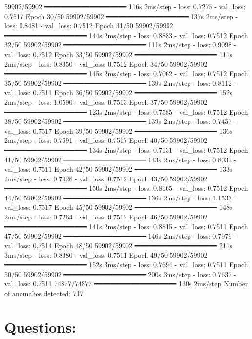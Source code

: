 59902/59902 ━━━━━━━━━━━━━━━━━━━━ 116s 2ms/step - loss: 0.7275 - val_loss: 0.7517
Epoch 30/50
59902/59902 ━━━━━━━━━━━━━━━━━━━━ 137s 2ms/step - loss: 0.8481 - val_loss: 0.7512
Epoch 31/50
59902/59902 ━━━━━━━━━━━━━━━━━━━━ 144s 2ms/step - loss: 0.8883 - val_loss: 0.7512
Epoch 32/50
59902/59902 ━━━━━━━━━━━━━━━━━━━━ 111s 2ms/step - loss: 0.9098 - val_loss: 0.7512
Epoch 33/50
59902/59902 ━━━━━━━━━━━━━━━━━━━━ 111s 2ms/step - loss: 0.8350 - val_loss: 0.7512
Epoch 34/50
59902/59902 ━━━━━━━━━━━━━━━━━━━━ 145s 2ms/step - loss: 0.7062 - val_loss: 0.7512
Epoch 35/50
59902/59902 ━━━━━━━━━━━━━━━━━━━━ 139s 2ms/step - loss: 0.8112 - val_loss: 0.7511
Epoch 36/50
59902/59902 ━━━━━━━━━━━━━━━━━━━━ 152s 2ms/step - loss: 1.0590 - val_loss: 0.7513
Epoch 37/50
59902/59902 ━━━━━━━━━━━━━━━━━━━━ 123s 2ms/step - loss: 0.7585 - val_loss: 0.7512
Epoch 38/50
59902/59902 ━━━━━━━━━━━━━━━━━━━━ 139s 2ms/step - loss: 0.7457 - val_loss: 0.7517
Epoch 39/50
59902/59902 ━━━━━━━━━━━━━━━━━━━━ 136s 2ms/step - loss: 0.7591 - val_loss: 0.7517
Epoch 40/50
59902/59902 ━━━━━━━━━━━━━━━━━━━━ 134s 2ms/step - loss: 0.7131 - val_loss: 0.7512
Epoch 41/50
59902/59902 ━━━━━━━━━━━━━━━━━━━━ 143s 2ms/step - loss: 0.8032 - val_loss: 0.7511
Epoch 42/50
59902/59902 ━━━━━━━━━━━━━━━━━━━━ 133s 2ms/step - loss: 0.7928 - val_loss: 0.7512
Epoch 43/50
59902/59902 ━━━━━━━━━━━━━━━━━━━━ 150s 2ms/step - loss: 0.8165 - val_loss: 0.7512
Epoch 44/50
59902/59902 ━━━━━━━━━━━━━━━━━━━━ 136s 2ms/step - loss: 1.1533 - val_loss: 0.7517
Epoch 45/50
59902/59902 ━━━━━━━━━━━━━━━━━━━━ 148s 2ms/step - loss: 0.7264 - val_loss: 0.7512
Epoch 46/50
59902/59902 ━━━━━━━━━━━━━━━━━━━━ 141s 2ms/step - loss: 0.8815 - val_loss: 0.7511
Epoch 47/50
59902/59902 ━━━━━━━━━━━━━━━━━━━━ 146s 2ms/step - loss: 0.7979 - val_loss: 0.7514
Epoch 48/50
59902/59902 ━━━━━━━━━━━━━━━━━━━━ 211s 3ms/step - loss: 0.8380 - val_loss: 0.7511
Epoch 49/50
59902/59902 ━━━━━━━━━━━━━━━━━━━━ 152s 3ms/step - loss: 0.7694 - val_loss: 0.7511
Epoch 50/50
59902/59902 ━━━━━━━━━━━━━━━━━━━━ 200s 3ms/step - loss: 0.7637 - val_loss: 0.7511
74877/74877 ━━━━━━━━━━━━━━━━━━━━ 130s 2ms/step
Number of anomalies detected: 717

\section*{Questions: }
